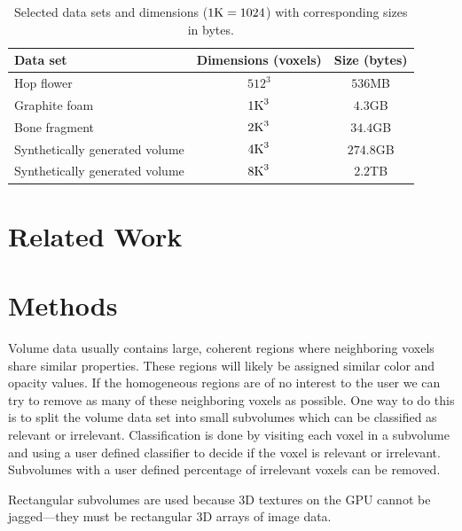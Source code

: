 \documentclass[journal]{vgtc}                %
\begin{document}
\begin{table}[h]\label{table:targetedDataSets}
	 	 \caption{Selected data sets and dimensions ($1\textnormal{K}=\nobreak1024$) 
	 	 	with corresponding sizes in bytes.}
	 \scriptsize

	\begin{center}
		\begin{tabular}{lcc}
			\textbf{Data set} & \textbf{Dimensions} (voxels) & \textbf{Size} (bytes)\\
			\hline
			Hop flower & $512^3$ & $536$MB \\
			Graphite foam & $1\textnormal{K}^3$ & $4.3$GB  \\
			Bone fragment & $2\textnormal{K}^3$ & $34.4$GB  \\
			Synthetically generated volume & $4\textnormal{K}^3$ & $274.8$GB \\
			Synthetically generated volume & $8\textnormal{K}^3$ & $2.2$TB  \\
		\end{tabular}
	\end{center}
	
\end{table}

\section{Related Work}

\section{Methods}

Volume data usually contains large, coherent regions where neighboring voxels
share similar properties. These regions will likely be assigned similar color
and opacity values. If the homogeneous regions are of no interest to the user
we can try to remove as many of these neighboring voxels as possible.
One way to do this is to split the volume data set into small 
subvolumes which can be classified as relevant or irrelevant. Classification
is done by visiting each voxel in a subvolume and using a user defined 
classifier to decide if the voxel is relevant or irrelevant. Subvolumes with a
user defined percentage of irrelevant voxels can be removed.

Rectangular subvolumes are used because 3D textures on the GPU cannot
be jagged---they must be rectangular 3D arrays of image data.
\end{document}

